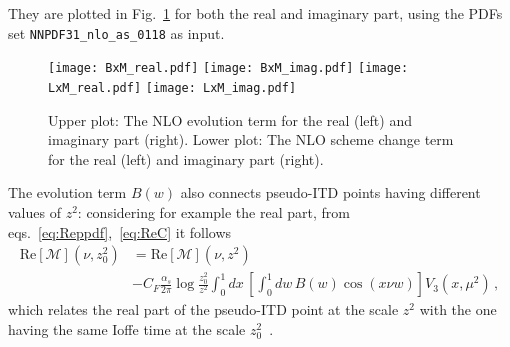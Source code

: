 They are plotted in Fig.~\ref{fig::BL} for both the real and imaginary part, using the PDFs set 
{\tt NNPDF31\_nlo\_as\_0118} as input.
\begin{figure}[h!]
    \center
    \texttt{[image: BxM\_real.pdf]}
    \texttt{[image: BxM\_imag.pdf]}
    \texttt{[image: LxM\_real.pdf]}
    \texttt{[image: LxM\_imag.pdf]}
    \caption{Upper plot: The NLO evolution term for the real (left) and imaginary part (right). 
    Lower plot: The NLO scheme change term for the real (left) and imaginary part (right).}
    \label{fig::BL}
\end{figure}
The evolution term $B\left(w\right)$ also connects pseudo-ITD points having different values of $z^2$: 
considering for example the real part, from eqs.~\eqref{eq:Reppdf},~\eqref{eq:ReC} it follows
\begin{align}
    \label{eq::evolRe}
        \text{Re}\left[\mathcal{M}\right]\left(\nu, z_0^2\right) &= 
        \text{Re}\left[\mathcal{M}\right]\left(\nu, z^2\right) \nonumber\\ 
        &- C_F \frac{\alpha_s}{2\pi}\log\frac{z_0^2}{z^2} 
		\int_{0}^{1} dx\,\left[\int_0^1 dw \,B\left(w\right)  \cos\left(x\nu w\right)\right] 
		V_3\left(x,\mu^2\right)\,,
\end{align}
which relates the real part of the pseudo-ITD point at the scale $z^2$ with the one
having the same Ioffe time at the scale $z_0^2$~\cite{Orginos:2017kos,Karpie:2017bzm}. 

